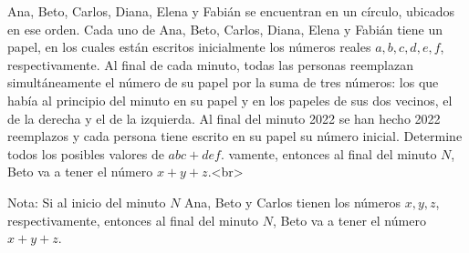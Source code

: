 Ana, Beto, Carlos, Diana, Elena y Fabián se encuentran en un círculo, ubicados en ese orden. Cada uno de Ana, Beto, Carlos, Diana, Elena y Fabián tiene un papel, en los cuales están escritos inicialmente los números reales $a, b, c, d, e, f$, respectivamente. Al final de cada minuto, todas las personas reemplazan simultáneamente el número de su papel por la suma de tres números: los que había al principio del minuto en su papel y en los papeles de sus dos vecinos, el de la derecha y el de la izquierda. Al final del minuto 2022 se han hecho 2022 reemplazos y cada persona tiene escrito en su papel su número inicial. Determine todos los posibles valores de $abc + def$.
vamente, entonces al final del minuto $N$, Beto va a tener el número $x + y + z$.<br>

Nota: Si al inicio del minuto $N$ Ana, Beto y Carlos tienen los números $x,y,z$, respectivamente, entonces al final del minuto $N$, Beto va a tener el número $x + y + z$.